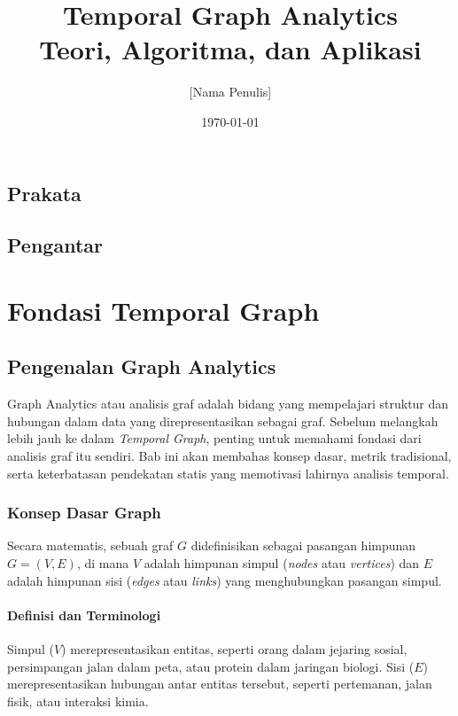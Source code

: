 \documentclass[12pt,a4paper]{book}
\title{\textbf{Temporal Graph Analytics}\\
\large Teori, Algoritma, dan Aplikasi}
\author{[Nama Penulis]}
\date{\today}
\begin{document}
\maketitle

\tableofcontents

\chapter*{Prakata}

\chapter*{Pengantar}

\part{Fondasi Temporal Graph}

\chapter{Pengenalan Graph Analytics}
Graph Analytics atau analisis graf adalah bidang yang mempelajari struktur dan hubungan dalam data yang direpresentasikan sebagai graf. Sebelum melangkah lebih jauh ke dalam \textit{Temporal Graph}, penting untuk memahami fondasi dari analisis graf itu sendiri. Bab ini akan membahas konsep dasar, metrik tradisional, serta keterbatasan pendekatan statis yang memotivasi lahirnya analisis temporal.

\section{Konsep Dasar Graph}
Secara matematis, sebuah graf $G$ didefinisikan sebagai pasangan himpunan $G = (V, E)$, di mana $V$ adalah himpunan simpul (\textit{nodes} atau \textit{vertices}) dan $E$ adalah himpunan sisi (\textit{edges} atau \textit{links}) yang menghubungkan pasangan simpul.

\subsection{Definisi dan Terminologi}
Simpul ($V$) merepresentasikan entitas, seperti orang dalam jejaring sosial, persimpangan jalan dalam peta, atau protein dalam jaringan biologi. Sisi ($E$) merepresentasikan hubungan antar entitas tersebut, seperti pertemanan, jalan fisik, atau interaksi kimia.
\end{document}
